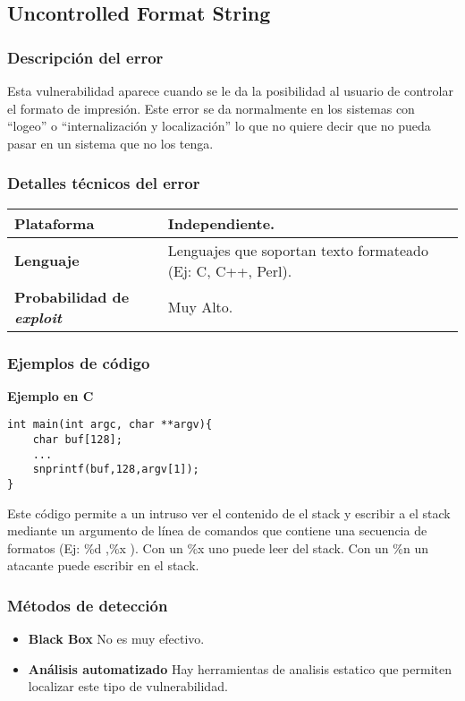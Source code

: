 \subsection{Uncontrolled Format String}

\subsubsection{Descripción del error}

Esta vulnerabilidad aparece cuando se le da la posibilidad al usuario de controlar el formato de impresión.
Este error se da normalmente en los sistemas con ``logeo'' o ``internalización y localización'' lo que no quiere decir que no pueda pasar en un sistema que no los tenga.


\subsubsection{Detalles técnicos del error}
\begin{tabular}[\baselineskip]{|l|p{7cm}|}
  \hline
  \textbf{Plataforma} & Independiente. \\
  \hline
  \textbf{Lenguaje} & Lenguajes que soportan texto formateado (Ej: C, C++, Perl). \\
  \hline
  \textbf{Probabilidad de \emph{exploit}} & Muy Alto. \\
  \hline
\end{tabular}

\subsubsection{Ejemplos de código}

\noindent \textbf{Ejemplo en C}\\

\begin{lstlisting}[frame=single]
int main(int argc, char **argv){
	char buf[128];
	...
	snprintf(buf,128,argv[1]);
}
\end{lstlisting}
Este código permite a un intruso ver el contenido de el stack y escribir a el stack mediante un argumento de línea de
comandos que contiene una secuencia de formatos (Ej: \%d ,\%x ).
Con un \%x uno puede leer del stack.
Con un \%n un atacante puede escribir en el stack.

\subsubsection{Métodos de detección}
\begin{itemize}
 \item \textbf{Black Box}
 	No es muy efectivo.
  \item \textbf{Análisis automatizado}
  	Hay herramientas de analisis estatico que permiten localizar este tipo de vulnerabilidad.
\end{itemize}

